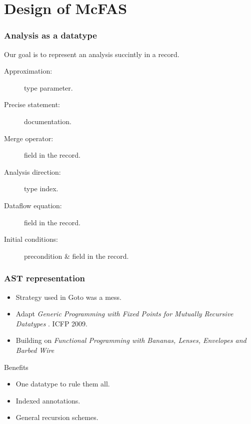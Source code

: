 \documentclass{beamer}
\begin{document}
\section{Design of McFAS}

\begin{frame}
  \frametitle{Analysis as a datatype}

  Our goal is to represent an analysis succintly in a record.

  \pause

  \begin{description}
    \item[Approximation:] type parameter.
    \item[Precise statement:] documentation.
    \item[Merge operator:] field in the record.
    \item[Analysis direction:] type index.
    \item[Dataflow equation:] field in the record.
    \item[Initial conditions:] precondition \& field in the record.
  \end{description}
\end{frame}

\begin{frame}
  \frametitle{AST representation}

  \pause

  \begin{itemize}
    \item Strategy used in Goto was a mess.
    \item Adapt
      \emph{
        Generic Programming with Fixed Points for Mutually Recursive Datatypes
      }.
      ICFP 2009.
    \item Building on
      \emph{
        Functional Programming with Bananas, Lenses, Envelopes and Barbed Wire
      }
  \end{itemize}

  \pause

  \begin{block}{Benefits}
    \begin{itemize}
      \item One datatype to rule them all.
      \item Indexed annotations.
      \item General recursion schemes.
    \end{itemize}
  \end{block}
\end{frame}
\end{document}
